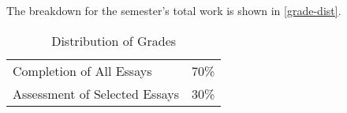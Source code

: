 \documentclass[titlepage]{article}
\newcommand\policy{../policy}
\begin{document}
\begin{enumerate}
%
%
%
%

\end{enumerate}

The breakdown for the semester's total work is shown in
\autoref{grade-dist}.

\begin{table}[htbp]
  \centering
  {\lining
  \begin{tabular}{lr}
    \toprule
    Completion of All Essays      & 70\% \\
    Assessment of Selected Essays & 30\% \\
    \bottomrule
  \end{tabular}}
  \caption{Distribution of Grades}
  \label{grade-dist}
\end{table}



\end{document}
